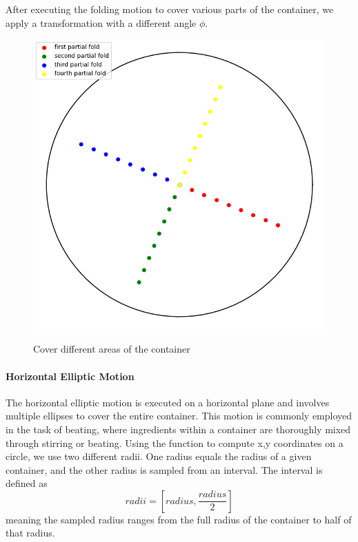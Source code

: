 After executing the folding motion to cover various parts of the container, we apply a transformation with a different angle $\phi$.

\begin{figure}[H]
    \includegraphics[scale=0.35]{Graphics/motions/folding1.png}
    \centering
    \label{fig:foldingMotion1}
    \caption{Cover different areas of the container}
\end{figure}

\paragraph{Horizontal Elliptic Motion}
The horizontal elliptic motion is executed on a horizontal plane and involves multiple ellipses to cover the entire container.
This motion is commonly employed in the task of beating, where ingredients within a container are thoroughly mixed through stirring or beating.
\newline
\newline
Using the function to compute x,y coordinates on a circle, we use two different radii.
One radius equals the radius of a given container, and the other radius is sampled from an interval. The interval is defined as \[radii = [radius, \frac{radius} {2} ]\]
meaning the sampled radius ranges from the full radius of the container to half of that radius.

